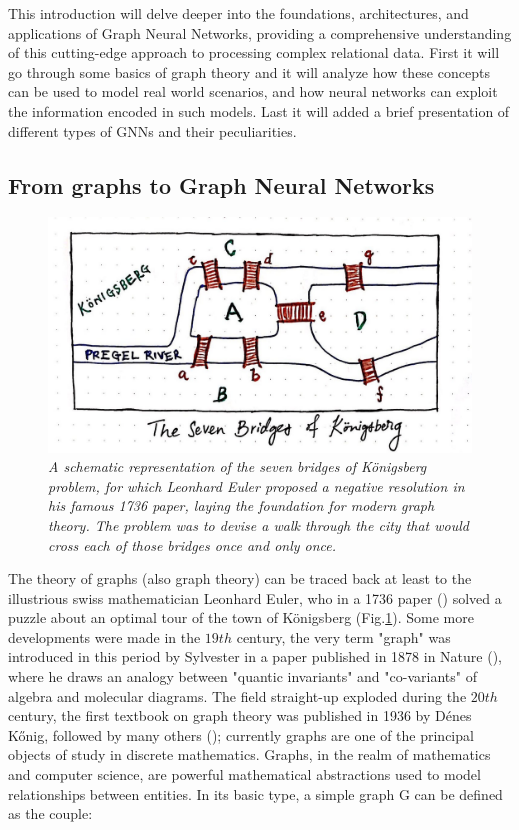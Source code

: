 \documentclass[binding=0.6cm]{sapthesis}
\newcommand{\mycite}[1]{(\cite{#1})}
\begin{document}
This introduction will delve deeper into the foundations, architectures, and applications of Graph Neural Networks, providing a comprehensive understanding of this cutting-edge approach to processing complex relational data. First it will go through some basics of graph theory and it will analyze how these concepts can be used to model real world scenarios, and how neural networks  can exploit the information encoded in such models. Last it will added a brief presentation of different types of GNNs and their peculiarities.

\subsection{From graphs to Graph Neural Networks}
\label{sec:bg.gnn.graph-base}

\begin{figure}
    \centering
    \includegraphics[width=\textwidth]{imgs/background/konigsberg-bridges-02.jpeg}   
    \caption{\textit{A schematic representation of the seven bridges of Königsberg problem, for which Leonhard Euler proposed a negative resolution in his famous 1736 paper, laying the foundation for modern graph theory. The problem was to devise a walk through the city that would cross each of those bridges once and only once.}}
    \label{fig:bg.gnn.konigsbridge}
\end{figure}
The theory of graphs (also graph theory) can be traced back at least to the illustrious swiss mathematician Leonhard Euler, who in a 1736 paper \mycite{gazette_1987} solved a puzzle about an optimal tour of the town of Königsberg (Fig.\ref{fig:bg.gnn.konigsbridge}). Some more developments were made in the $19th$ century, the very term "graph" was introduced in this period by Sylvester in a paper published in 1878 in Nature \mycite{Sylvester1878ChemistryAA}, where he draws an analogy between "quantic invariants" and "co-variants" of algebra and molecular diagrams. The field straight-up exploded during the $20th$ century, the first textbook on graph theory was published in 1936 by Dénes Kőnig, followed by many others \mycite{tutte2001graph}; currently graphs are one of the principal objects of study in discrete mathematics. Graphs, in the realm of mathematics and computer science, are powerful mathematical abstractions used to model relationships between entities. In its basic type, a simple graph G can be defined as the couple:
\end{document}
